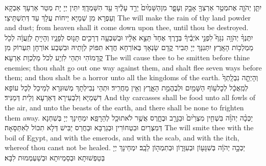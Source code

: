 {יִתֵּ֧ן יְהֹוָ֛ה אֶת\maqqaf מְטַ֥ר אַרְצְךָ֖ אָבָ֣ק וְעָפָ֑ר מִן\maqqaf הַשָּׁמַ֙יִם֙ יֵרֵ֣ד עָלֶ֔יךָ עַ֖ד הִשָּׁמְדָֽךְ׃}
{יִתֵּין יְיָ יָת מְטַר אַרְעָךְ אַבְקָא וְעַפְרָא מִן שְׁמַיָּא יֵיחוֹת עֲלָךְ עַד דְּתִשְׁתֵּיצֵי׃}
{The \lord\space will make the rain of thy land powder and dust; from heaven shall it come down upon thee, until thou be destroyed.}{}
{יִתֶּנְךָ֨ יְהֹוָ֥ה \pasek  נִגָּף֮ לִפְנֵ֣י אֹיְבֶ֒יךָ֒ בְּדֶ֤רֶךְ אֶחָד֙ תֵּצֵ֣א אֵלָ֔יו וּבְשִׁבְעָ֥ה דְרָכִ֖ים תָּנ֣וּס לְפָנָ֑יו וְהָיִ֣יתָ לְזַֽעֲוָ֔ה לְכֹ֖ל מַמְלְכ֥וֹת הָאָֽרֶץ׃}
{יִתְּנִנָּךְ יְיָ תְּבִיר קֳדָם שָׂנְאָךְ בְּאוֹרְחָא חֲדָא תִּפּוֹק לְוָתֵיהּ וּבִשְׁבַע אוֹרְחָן תִּעְרוֹק מִן קֳדָמוֹהִי וּתְהֵי לִזְיָע לְכֹל מַלְכְוָת אַרְעָא׃}
{The \lord\space will cause thee to be smitten before thine enemies; thou shalt go out one way against them, and shalt flee seven ways before them; and thou shalt be a horror unto all the kingdoms of the earth.}{}
{וְהָיְתָ֤ה נִבְלָֽתְךָ֙ לְמַֽאֲכָ֔ל לְכׇל\maqqaf ע֥וֹף הַשָּׁמַ֖יִם וּלְבֶהֱמַ֣ת הָאָ֑רֶץ וְאֵ֖ין מַחֲרִֽיד׃}
{וּתְהֵי נְבִילְתָךְ מְשׁוּגְּרָא לְמֵיכַל לְכָל עוֹפָא דִּשְׁמַיָּא וְלִבְעִירָא דְּאַרְעָא וְלֵית דְּמַנִּיד׃}
{And thy carcasses shall be food unto all fowls of the air, and unto the beasts of the earth, and there shall be none to frighten them away.}{}
{יַכְּכָ֨ה יְהֹוָ֜ה בִּשְׁחִ֤ין מִצְרַ֙יִם֙  וּבַגָּרָ֖ב וּבֶחָ֑רֶס אֲשֶׁ֥ר לֹא\maqqaf תוּכַ֖ל לְהֵרָפֵֽא׃}
{יִמְחֵינָךְ יְיָ בְּשִׁחְנָא דְּמִצְרַיִם וּבִטְחוֹרִין וּבְגַרְבָּא וּבַחֲרַס יַבִּישׁ דְּלָא תִכּוֹל לְאִתַּסָּאָה׃}
{The \lord\space will smite thee with the boil of Egypt, and with the emerods, and with the scab, and with the itch, whereof thou canst not be healed.}{}
{יַכְּכָ֣ה יְהֹוָ֔ה בְּשִׁגָּע֖וֹן וּבְעִוָּר֑וֹן וּבְתִמְה֖וֹן לֵבָֽב׃}
{יִמְחֵינָךְ יְיָ בְּטַפְשׁוּתָא וּבְסַמְיוּתָא וּבְשַׁעְמְמוּת לִבָּא׃}
